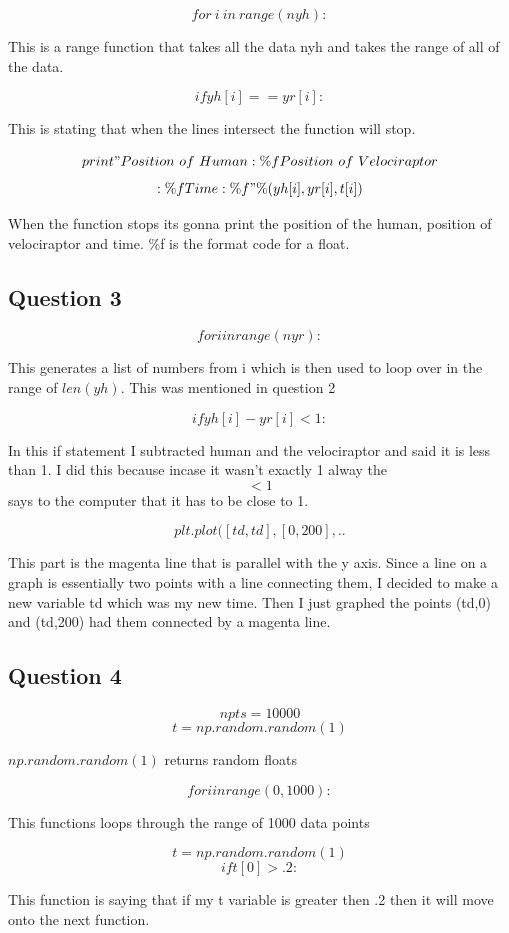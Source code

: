 \documentclass[twocolumn]{revtex4}
\begin{document}
$$for~ i~ in~ range(nyh):$$

This is a range function that takes all the data nyh and takes the range of all of the data.


$$if yh[i] == yr[i]:$$

This is stating that when the lines intersect the function will stop. 

 $$print "Position ~of~ Human: \%f Position~ of ~Velociraptor$$
 $$:\%f Time: \%f" \% (yh[i], yr[i],t[i])$$

When the function stops its gonna print the position of the human, position of velociraptor and time. \%f is the format code for a float.

\subsection{ Question 3}
$$for i in range (nyr):$$

This generates a list of numbers from i which is then used to loop over in the range of  $len(yh)$. This was mentioned in question 2

$$if yh[i]-yr[i] <1:$$


In this if statement I subtracted human and the velociraptor and said it is less than 1. I did this because incase it wasn't exactly 1 alway the $$<1$$ says to the computer that it has to be close to 1. 

$$plt.plot([td,td],[0,200],..$$

This part is the magenta line that is parallel with the y axis. Since a line on a graph is essentially two points with a line connecting them, I decided to make a new variable td which was my new time. Then I just graphed the points (td,0) and (td,200) had them connected by a magenta line. 

\subsection{Question 4}

$$npts = 10000$$
$$t = np.random.random(1)$$

$np.random.random(1)$ returns random floats

$$for i in range (0,1000):$$

This functions loops through the range of 1000 data points 

$$ t = np.random.random(1)$$
$$if t[0]>.2:$$

This function is saying that if my t variable is greater then .2 then it will move onto the next function.
\end{document}
